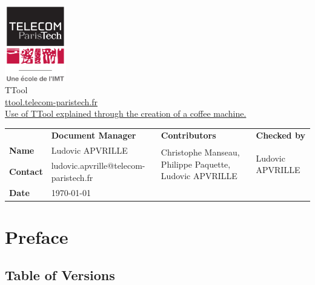 \documentclass[12pt]{article}
\begin{document}
\sloppy 

\begin{center}

\includegraphics[width=0.2\textwidth]{fig/logotpt}
\vspace{10 pt}\\
\Huge TTool \\
\vspace{10 pt}
\Large \url{ttool.telecom-paristech.fr}
\vspace{20 pt}\\
\underline{\Large Use of TTool explained through the creation of a coffee machine.}
\vspace{30 pt}
\end{center}

\begin{table}[H]
\large
\centering
\begin{adjustbox}{width=\textwidth}
\begin{tabular}{ |p{1.6cm}|p{6.0cm}|p{4.2cm}|p{4.2cm}| }
\hhline{----}
 & \textbf{Document Manager} & \textbf{Contributors}  & \textbf{Checked by}  \\ 
\hhline{----}
\textbf{Name}   & Ludovic APVRILLE & \multirow{2}{4.2cm}{Christophe Manseau, Philippe Paquette,
Ludovic APVRILLE} &
\multirow{2}{*}{Ludovic APVRILLE} \\
\hhline{--~~}
\textbf{Contact} & ludovic.apvrille@telecom-paristech.fr &  &  \\ 
\hhline{--~~}
\textbf{Date} & \today &  &  \\ 
\hline
\end{tabular}
\end{adjustbox}
\end{table}

\newpage
\tableofcontents


\newpage
\section{Preface}

\subsection{Table of Versions}
\end{document}
